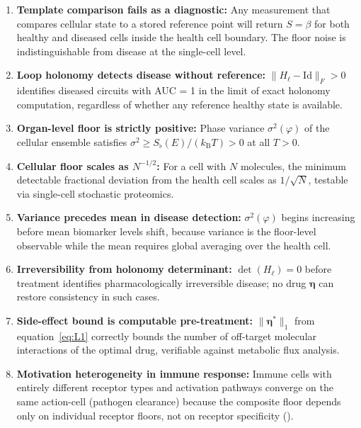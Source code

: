\documentclass[twocolumn,11pt,a4paper]{article}
\newcommand{\kB}{k_{\mathrm{B}}}
\newcommand{\Sfloor}{S_{\flat}}
\newcommand{\HolL}{H_\ell}
\newcommand{\drugvec}{\boldsymbol{\eta}}
\begin{document}
\begin{enumerate}[leftmargin=*,nosep,itemsep=3pt]

\item \textbf{Template comparison fails as a diagnostic:} Any measurement
that compares cellular state to a stored reference point will return
$S = \beta$ for both healthy and diseased cells inside the health cell
boundary. The floor noise is indistinguishable from disease at the
single-cell level.

\item \textbf{Loop holonomy detects disease without reference:}
$\|\HolL - \mathrm{Id}\|_F > 0$ identifies diseased circuits with
AUC = 1 in the limit of exact holonomy computation, regardless of
whether any reference healthy state is available.

\item \textbf{Organ-level floor is strictly positive:} Phase variance
$\sigma^2(\varphi)$ of the cellular ensemble satisfies
$\sigma^2 \geq \Sfloor(E) / (\kB T) > 0$ at all $T > 0$.

\item \textbf{Cellular floor scales as $N^{-1/2}$:} For a cell with
$N$ molecules, the minimum detectable fractional deviation from the
health cell scales as $1/\sqrt{N}$, testable via single-cell
stochastic proteomics.

\item \textbf{Variance precedes mean in disease detection:}
$\sigma^2(\varphi)$ begins increasing before mean biomarker levels
shift, because variance is the floor-level observable while the mean
requires global averaging over the health cell.

\item \textbf{Irreversibility from holonomy determinant:}
$\det(\HolL) = 0$ before treatment identifies pharmacologically
irreversible disease; no drug $\drugvec$ can restore consistency
in such cases.

\item \textbf{Side-effect bound is computable pre-treatment:}
$\|\drugvec^*\|_1$ from equation~\eqref{eq:L1} correctly bounds the
number of off-target molecular interactions of the optimal drug,
verifiable against metabolic flux analysis.

\item \textbf{Motivation heterogeneity in immune response:}
Immune cells with entirely different receptor types and activation
pathways converge on the same action-cell (pathogen clearance) because
the composite floor depends only on individual receptor floors, not on
receptor specificity ().


\end{enumerate}
\end{document}
